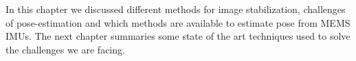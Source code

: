 

In this chapter we discussed different methods for image stabilization, challenges of pose-estimation and which methods are available to estimate pose from MEMS IMUs. The next chapter summaries some state of the art techniques used to solve the challenges we are facing.
